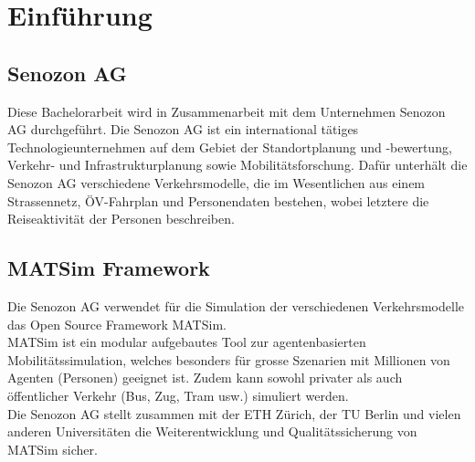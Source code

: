 \chapter{Einführung}

\section{Senozon AG}
Diese Bachelorarbeit wird in Zusammenarbeit mit dem Unternehmen Senozon AG durchgeführt. Die Senozon AG ist ein international tätiges Technologieunternehmen auf dem Gebiet der Standortplanung und -bewertung, Verkehr- und Infrastrukturplanung sowie Mobilitätsforschung. Dafür unterhält die Senozon AG verschiedene Verkehrsmodelle, die im Wesentlichen aus einem Strassennetz, ÖV-Fahrplan und Personendaten bestehen, wobei letztere die Reiseaktivität der Personen beschreiben.
\section{MATSim Framework}
Die Senozon AG verwendet für die Simulation der verschiedenen Verkehrsmodelle das Open Source Framework MATSim.\\
MATSim ist ein modular aufgebautes Tool zur agentenbasierten Mobilitätssimulation, welches besonders für grosse Szenarien mit Millionen von Agenten (Personen) geeignet ist. Zudem kann sowohl privater als auch öffentlicher Verkehr (Bus, Zug, Tram usw.) simuliert werden.\\
Die Senozon AG stellt zusammen mit der ETH Zürich, der TU Berlin und vielen anderen Universitäten die Weiterentwicklung und Qualitätssicherung von MATSim sicher.
